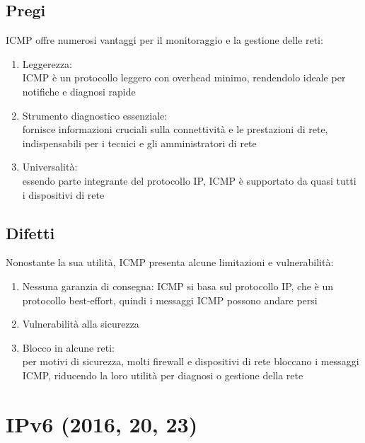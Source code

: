 \documentclass[10pt,oneside,a4paper]{article}
\begin{document}
\subsection{Pregi}
ICMP offre numerosi vantaggi per il monitoraggio e la gestione delle reti:
\begin{enumerate}
\item Leggerezza:\\
ICMP è un protocollo leggero con overhead minimo, rendendolo ideale per notifiche e diagnosi rapide
\item Strumento diagnostico essenziale:\\
fornisce informazioni cruciali sulla connettività e le prestazioni di rete, indispensabili per i tecnici e gli amministratori di rete
\item Universalità:\\
essendo parte integrante del protocollo IP, ICMP è supportato da quasi tutti i dispositivi di rete
\end{enumerate}
\subsection{Difetti}
Nonostante la sua utilità, ICMP presenta alcune limitazioni e vulnerabilità:
\begin{enumerate}
\item Nessuna garanzia di consegna: ICMP si basa sul protocollo IP, che è un protocollo best-effort, quindi i messaggi ICMP possono andare persi
\item Vulnerabilità alla sicurezza
\item Blocco in alcune reti:\\
per motivi di sicurezza, molti firewall e dispositivi di rete bloccano i messaggi ICMP, riducendo la loro utilità per diagnosi o gestione della rete
\end{enumerate}
\section{IPv6 (2016, 20, 23)}
\end{document}

